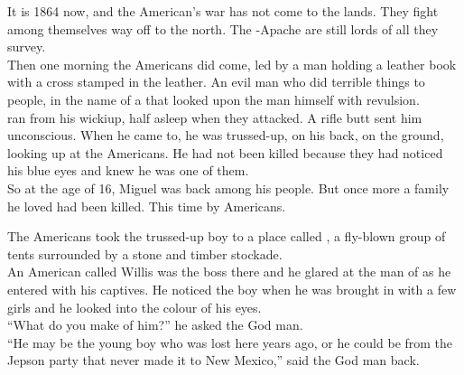 


It is 1864 now, and the American's war has not come to the  lands. They fight among themselves way off to the north. The -Apache are still lords of all they survey. \\

Then one morning the Americans did come, led by a man holding a leather book with a cross stamped in the leather. An evil man who did terrible things to people, in the name of a  that looked upon the man himself with revulsion. \\

 ran from his wickiup, half asleep when they attacked. A rifle butt sent him unconscious. When he came to, he was trussed-up, on his back, on the ground, looking up at the Americans. He had not been killed because they had noticed his blue eyes and knew he was one of them. \\

So at the age of 16, Miguel was back among his  people. But once more a family he loved had been killed. This time by Americans. \\





The Americans took the trussed-up boy to a place called , a fly-blown group of tents surrounded by a stone and timber stockade. \\

An American called Willis was the boss there and he glared at the man of  as he entered with his captives. He noticed the boy when he was brought in with a few  girls and he looked into the colour of his eyes. \\

``What do you make of him?'' he asked the God man. \\
``He may be the young  boy who was lost here years ago, or he could be from the Jepson party that never made it to New Mexico,'' said the God man back. \\

